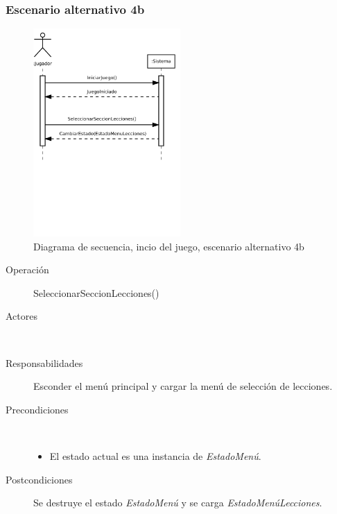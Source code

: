 \subsubsection{Escenario alternativo 4b}
\begin{figure}[h!]
  \centering
  \includegraphics[trim=0cm 12cm 0cm 0cm, clip=true, width=0.5\textwidth]{4_analisis/diagsec_caso1_esc3}
  \caption{Diagrama de secuencia, incio del juego, escenario alternativo 4b}
\end{figure}

\begin{description}
\item[Operación] SeleccionarSeccionLecciones()
\item[Actores] \jugador\, \sistema\
\item[Responsabilidades] Esconder el menú principal y cargar la menú de
  selección de lecciones.
\item[Precondiciones] $\quad$
  \begin{itemize}
  \item El estado actual es una instancia de \textit{EstadoMenú}.
  \end{itemize}
\item[Postcondiciones] Se destruye el estado \textit{EstadoMenú} y se carga
  \textit{EstadoMenúLecciones}.
\end{description}


